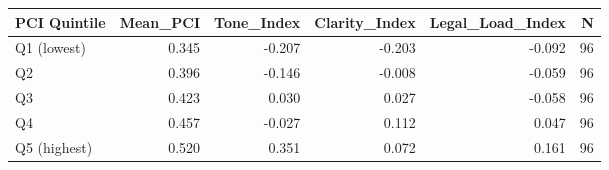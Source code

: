 \begin{tabular}{lrrrrr}
\toprule
PCI Quintile & Mean_PCI & Tone_Index & Clarity_Index & Legal_Load_Index & N \\
\midrule
Q1 (lowest) & 0.345 & -0.207 & -0.203 & -0.092 & 96 \\
Q2 & 0.396 & -0.146 & -0.008 & -0.059 & 96 \\
Q3 & 0.423 & 0.030 & 0.027 & -0.058 & 96 \\
Q4 & 0.457 & -0.027 & 0.112 & 0.047 & 96 \\
Q5 (highest) & 0.520 & 0.351 & 0.072 & 0.161 & 96 \\
\bottomrule
\end{tabular}
